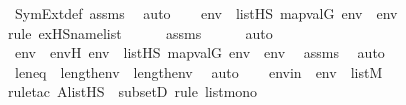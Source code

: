 \begin{isabellebody}
\ SymExt{\isacharunderscore}{\kern0pt}def\ assms\ \isamarkupfalse%
\ auto\isanewline
\ \ \isamarkupfalse%
\ {\isachardoublequoteopen}{\isasymexists}env{\isacharprime}{\kern0pt}\ {\isasymin}\ list{\isacharparenleft}{\kern0pt}HS{\isacharparenright}{\kern0pt}{\isachardot}{\kern0pt}\ map{\isacharparenleft}{\kern0pt}val{\isacharparenleft}{\kern0pt}G{\isacharparenright}{\kern0pt}{\isacharcomma}{\kern0pt}\ env{\isacharprime}{\kern0pt}{\isacharparenright}{\kern0pt}\ {\isacharequal}{\kern0pt}\ env{\isachardoublequoteclose}\ \isanewline
\ \ \ \ \isamarkupfalse%
{\isacharparenleft}{\kern0pt}rule\ ex{\isacharunderscore}{\kern0pt}HS{\isacharunderscore}{\kern0pt}name{\isacharunderscore}{\kern0pt}list{\isacharparenright}{\kern0pt}\isanewline
\ \ \ \ \isamarkupfalse%
\ assms\isanewline
\ \ \ \ \isamarkupfalse%
\ auto\isanewline
\ \ \isamarkupfalse%
\ \isamarkupfalse%
\ env{\isacharprime}{\kern0pt}\ \ env{\isacharprime}{\kern0pt}H{\isacharcolon}{\kern0pt}\ {\isachardoublequoteopen}env{\isacharprime}{\kern0pt}\ {\isasymin}\ list{\isacharparenleft}{\kern0pt}HS{\isacharparenright}{\kern0pt}{\isachardoublequoteclose}\ {\isachardoublequoteopen}map{\isacharparenleft}{\kern0pt}val{\isacharparenleft}{\kern0pt}G{\isacharparenright}{\kern0pt}{\isacharcomma}{\kern0pt}\ env{\isacharprime}{\kern0pt}{\isacharparenright}{\kern0pt}\ {\isacharequal}{\kern0pt}\ env{\isachardoublequoteclose}\ \isamarkupfalse%
\ assms\ \isamarkupfalse%
\ auto\isanewline
\ \ \isamarkupfalse%
\ \isamarkupfalse%
\ leneq\ {\isacharcolon}{\kern0pt}\ {\isachardoublequoteopen}length{\isacharparenleft}{\kern0pt}env{\isacharprime}{\kern0pt}{\isacharparenright}{\kern0pt}\ {\isacharequal}{\kern0pt}\ length{\isacharparenleft}{\kern0pt}env{\isacharparenright}{\kern0pt}{\isachardoublequoteclose}\ \isamarkupfalse%
\ auto\isanewline
\ \ \isamarkupfalse%
\ env{\isacharprime}{\kern0pt}in\ {\isacharcolon}{\kern0pt}\ {\isachardoublequoteopen}env{\isacharprime}{\kern0pt}\ {\isasymin}\ list{\isacharparenleft}{\kern0pt}M{\isacharparenright}{\kern0pt}{\isachardoublequoteclose}\ \isanewline
\ \ \ \ \isamarkupfalse%
{\isacharparenleft}{\kern0pt}rule{\isacharunderscore}{\kern0pt}tac\ A{\isacharequal}{\kern0pt}{\isachardoublequoteopen}list{\isacharparenleft}{\kern0pt}HS{\isacharparenright}{\kern0pt}{\isachardoublequoteclose}\ \ subsetD{\isacharcomma}{\kern0pt}\ rule\ list{\isacharunderscore}{\kern0pt}mono{\isacharparenright}{\kern0pt}\isanewline

\end{isabellebody}
